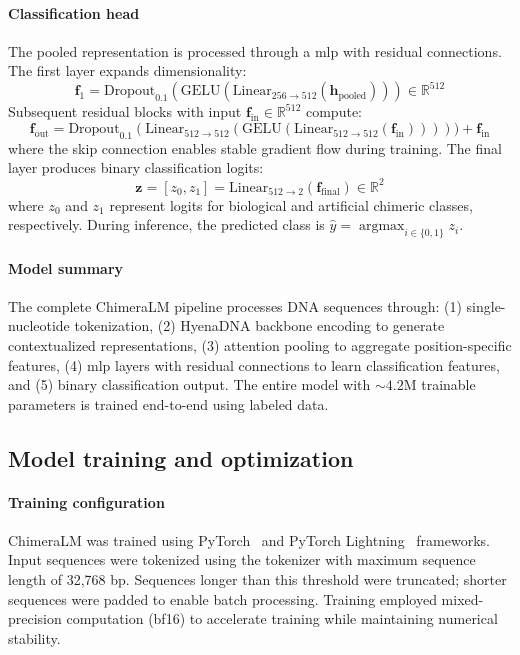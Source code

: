 \documentclass[pdflatex,lineno]{sn-jnl}%
\DeclareMathOperator*{\argmax}{argmax}
\begin{document}
\paragraph{Classification head}
The pooled representation is processed through a \gls{mlp} with residual connections.
The first layer expands dimensionality:
\[
	\mathbf{f}_1 = \text{Dropout}_{0.1}(\text{GELU}(\text{Linear}_{256 \to 512}(\mathbf{h}_{\text{pooled}}))) \in \mathbb{R}^{512}
\]
Subsequent residual blocks with input $\mathbf{f}_{\text{in}} \in \mathbb{R}^{512}$ compute:
\[
	\mathbf{f}_{\text{out}} = \text{Dropout}_{0.1}(\text{Linear}_{512 \to 512}(\text{GELU}(\text{Linear}_{512 \to 512}(\mathbf{f}_{\text{in}}))))) + \mathbf{f}_{\text{in}}
\]
where the skip connection enables stable gradient flow during training.
The final layer produces binary classification logits:
\[
	\mathbf{z} = [z_0, z_1] = \text{Linear}_{512 \to 2}(\mathbf{f}_{\text{final}}) \in \mathbb{R}^{2}
\]
where $z_0$ and $z_1$ represent logits for biological and artificial chimeric classes, respectively. During inference, the predicted class is $\hat{y} = \argmax_{i \in \{0,1\}} z_i$.

\paragraph{Model summary}
The complete ChimeraLM pipeline processes DNA sequences through: (1) single-nucleotide tokenization, (2) HyenaDNA backbone encoding to generate contextualized representations, (3) attention pooling to aggregate position-specific features, (4) \gls{mlp} layers with residual connections to learn classification features, and (5) binary classification output.
The entire model with ${\sim}4.2$M trainable parameters is trained end-to-end using labeled data.

\subsection*{Model training and optimization}

\paragraph{Training configuration}
ChimeraLM was trained using PyTorch~\cite{paszke2019pytorch} and PyTorch Lightning~\cite{Falcon_PyTorch_Lightning_2019} frameworks.
Input sequences were tokenized using the tokenizer with maximum sequence length of 32,768 bp.
Sequences longer than this threshold were truncated; shorter sequences were padded to enable batch processing.
Training employed mixed-precision computation (bf16) to accelerate training while maintaining numerical stability.
\end{document}
